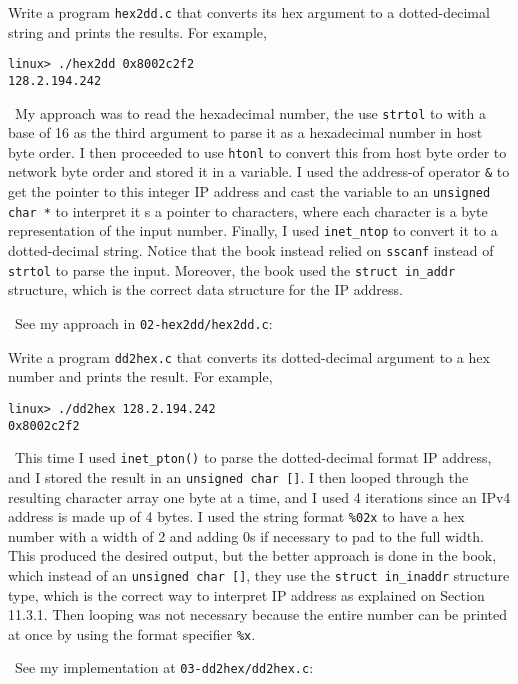\documentclass[12pt]{article}
\newenvironment{ex}[2][Exercise]{\begin{trivlist}
		\item[\hskip \labelsep {\bfseries #1}\hskip \labelsep {\bfseries #2.}]}{\end{trivlist}}
\newenvironment{sol}[1][Solution]{\begin{trivlist}
		\item[\hskip \labelsep {\bfseries #1:}]}{\end{trivlist}}
\begin{document}
\begin{ex}{11.2}
	Write a program \texttt{hex2dd.c} that converts its hex argument to a dotted-decimal
	string and prints the results. For example,
	\begin{lstlisting}[language={}]
linux> ./hex2dd 0x8002c2f2
128.2.194.242
	\end{lstlisting}
\end{ex}

\begin{sol}
	\
	My approach was to read the hexadecimal number, the use \texttt{strtol} to with a base
	of 16 as the third argument to parse it as a hexadecimal number in host byte order. I 
	then proceeded to use \texttt{htonl} to convert this from host byte order to network
	byte order and stored it in a variable. I used the address-of operator \texttt{\&} to get
	the pointer to this integer IP address and cast the variable to an \texttt{unsigned char *}
	to interpret it s a pointer to characters, where each character is a byte representation
	of the input number. Finally, I used \texttt{inet\_ntop} to convert it to a dotted-decimal
	string. Notice that the book instead relied on \texttt{sscanf} instead of \texttt{strtol}
	to parse the input. Moreover, the book used the \texttt{struct in\_addr} structure,
	which is the correct data structure for the IP address.
	
	\
	See my approach in \texttt{02-hex2dd/hex2dd.c}:
	
\end{sol}

\begin{ex}{11.3}
	Write a program \texttt{dd2hex.c} that converts its dotted-decimal argument to a hex number
	and prints the result. For example,
	\begin{lstlisting}[language={}]
linux> ./dd2hex 128.2.194.242
0x8002c2f2
	\end{lstlisting}
\end{ex}

\begin{sol}
	\
	This time I used \texttt{inet\_pton()} to parse the dotted-decimal format IP address,
	and I stored the result in an \texttt{unsigned char []}. I then looped through the
	resulting character array one byte at a time, and I used 4 iterations since an IPv4
	address is made up of 4 bytes. I used the string format \texttt{\%02x} to have a
	hex number with a width of 2 and adding 0s if necessary to pad to the full width.
	This produced the desired output, but the better approach is done in the book, which
	instead of an \texttt{unsigned char []}, they use the \texttt{struct in\_inaddr} structure
	type, which is the correct way to interpret IP address as explained on Section 11.3.1.
	Then looping was not necessary because the entire number can be printed at once by
	using the format specifier \texttt{\%x}.
	
	\
	See my implementation at \texttt{03-dd2hex/dd2hex.c}:
	
\end{sol}
\end{document}
